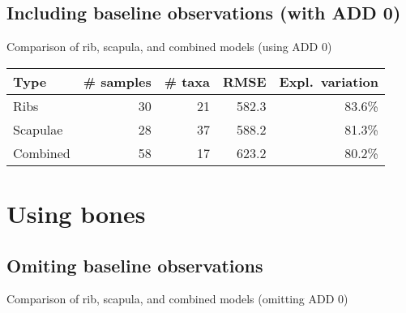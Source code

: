 \documentclass{beamer}
\begin{document}



\subsection{Including baseline observations (with ADD 0)}

\begin{frame}{Comparison of rib, scapula, and combined models (using ADD 0)}

  \begin{tabular}{lrrrr}
    Type & \# samples & \# taxa & RMSE & Expl.\ variation\\ \hline
    Ribs & 30 & 21 & 582.3 & 83.6\% \\
    Scapulae & 28 & 37 & 588.2 & 81.3\% \\
    Combined & 58 & 17 & 623.2 & 80.2\%
  \end{tabular}

\end{frame}








\section{Using bones}


\subsection{Omiting baseline observations}

\begin{frame}{Comparison of rib, scapula, and combined models (omitting ADD 0)}


  \vspace{0.2in}



\end{frame}
\end{document}
